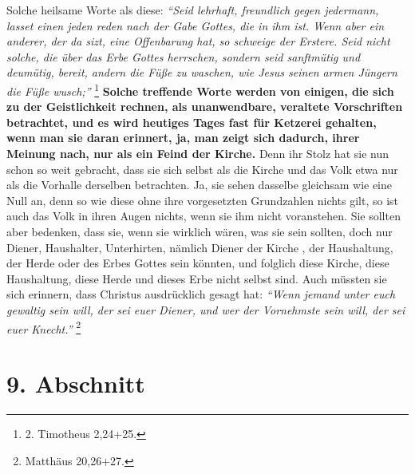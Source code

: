 Solche heilsame Worte als diese:
\textit{"`Seid lehrhaft, freundlich gegen jedermann,
lasset einen jeden reden nach der Gabe Gottes, die in ihm ist. Wenn aber ein
anderer, der da sizt, eine Offenbarung hat, so schweige der Erstere. Seid nicht
solche, die über das Erbe Gottes herrschen, sondern seid sanftmütig und
deumütig, bereit, andern die Füße zu waschen, wie Jesus seinen armen Jüngern die
Füße wusch;"'}
\footnote{2. Timotheus 2,24+25.}
\textbf{Solche treffende Worte werden von
einigen, die sich zu der Geistlichkeit rechnen, als
unanwendbare, veraltete
Vorschriften betrachtet, und es wird heutiges Tages fast für
Ketzerei gehalten,
wenn man sie daran erinnert, ja, man zeigt sich dadurch, ihrer Meinung nach, nur
als ein Feind der Kirche.} Denn ihr Stolz hat sie nun
schon so weit gebracht,
dass sie sich selbst als die Kirche und das Volk etwa nur als die Vorhalle
derselben betrachten. Ja, sie sehen dasselbe gleichsam wie eine Null an, denn so
wie diese ohne ihre vorgesetzten Grundzahlen nichts gilt, so ist auch das Volk in
ihren Augen nichts, wenn sie ihm nicht voranstehen. Sie sollten aber bedenken,
dass sie, wenn sie wirklich wären, was sie sein sollten, doch nur Diener,
Haushalter, Unterhirten, nämlich Diener der Kirche
, der
Haushaltung, der Herde
oder des Erbes Gottes sein könnten, und folglich diese Kirche, diese
Haushaltung, diese Herde und dieses Erbe nicht selbst sind. Auch müssten sie
sich erinnern, dass Christus ausdrücklich gesagt hat:
\textit{"`Wenn jemand unter euch
gewaltig sein will, der sei euer Diener, und wer der Vornehmste sein will, der
sei euer Knecht."'}
\footnote{Matthäus 20,26+27.}

\section{9. Abschnitt} \label{kap12_ab9}

